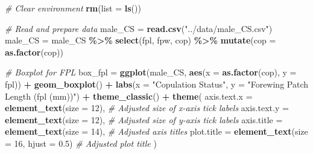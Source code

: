 \documentclass[
]{article}
\newenvironment{Shaded}{\begin{snugshade}}{\end{snugshade}}
\newcommand{\AttributeTok}[1]{\textcolor[rgb]{0.13,0.29,0.53}{#1}}
\newcommand{\CommentTok}[1]{\textcolor[rgb]{0.56,0.35,0.01}{\textit{#1}}}
\newcommand{\DecValTok}[1]{\textcolor[rgb]{0.00,0.00,0.81}{#1}}
\newcommand{\FloatTok}[1]{\textcolor[rgb]{0.00,0.00,0.81}{#1}}
\newcommand{\FunctionTok}[1]{\textcolor[rgb]{0.13,0.29,0.53}{\textbf{#1}}}
\newcommand{\NormalTok}[1]{#1}
\newcommand{\OtherTok}[1]{\textcolor[rgb]{0.56,0.35,0.01}{#1}}
\newcommand{\SpecialCharTok}[1]{\textcolor[rgb]{0.81,0.36,0.00}{\textbf{#1}}}
\newcommand{\StringTok}[1]{\textcolor[rgb]{0.31,0.60,0.02}{#1}}
\begin{document}
\begin{Shaded}
\begin{Highlighting}[]
\CommentTok{\# Clear environment}
\FunctionTok{rm}\NormalTok{(}\AttributeTok{list =} \FunctionTok{ls}\NormalTok{())}


\CommentTok{\# Read and prepare data}
\NormalTok{male\_CS }\OtherTok{=} \FunctionTok{read.csv}\NormalTok{(}\StringTok{"../data/male\_CS.csv"}\NormalTok{)}
\NormalTok{male\_CS }\OtherTok{=}\NormalTok{ male\_CS }\SpecialCharTok{\%\textgreater{}\%} 
  \FunctionTok{select}\NormalTok{(fpl, fpw, cop) }\SpecialCharTok{\%\textgreater{}\%} 
  \FunctionTok{mutate}\NormalTok{(}\AttributeTok{cop =} \FunctionTok{as.factor}\NormalTok{(cop))}

\CommentTok{\# Boxplot for FPL}
\NormalTok{box\_fpl }\OtherTok{=} \FunctionTok{ggplot}\NormalTok{(male\_CS, }\FunctionTok{aes}\NormalTok{(}\AttributeTok{x =} \FunctionTok{as.factor}\NormalTok{(cop), }\AttributeTok{y =}\NormalTok{ fpl)) }\SpecialCharTok{+}
  \FunctionTok{geom\_boxplot}\NormalTok{() }\SpecialCharTok{+}
  \FunctionTok{labs}\NormalTok{(}\AttributeTok{x =} \StringTok{"Copulation Status"}\NormalTok{, }\AttributeTok{y =} \StringTok{"Forewing Patch Length (fpl (mm))"}\NormalTok{) }\SpecialCharTok{+}
  \FunctionTok{theme\_classic}\NormalTok{() }\SpecialCharTok{+}
  \FunctionTok{theme}\NormalTok{(}
    \AttributeTok{axis.text.x =} \FunctionTok{element\_text}\NormalTok{(}\AttributeTok{size =} \DecValTok{12}\NormalTok{),  }\CommentTok{\# Adjusted size of x{-}axis tick labels}
    \AttributeTok{axis.text.y =} \FunctionTok{element\_text}\NormalTok{(}\AttributeTok{size =} \DecValTok{12}\NormalTok{),  }\CommentTok{\# Adjusted size of y{-}axis tick labels}
    \AttributeTok{axis.title =} \FunctionTok{element\_text}\NormalTok{(}\AttributeTok{size =} \DecValTok{14}\NormalTok{),   }\CommentTok{\# Adjusted axis titles}
    \AttributeTok{plot.title =} \FunctionTok{element\_text}\NormalTok{(}\AttributeTok{size =} \DecValTok{16}\NormalTok{, }\AttributeTok{hjust =} \FloatTok{0.5}\NormalTok{)  }\CommentTok{\# Adjusted plot title}
\NormalTok{  )}


\end{Highlighting}
\end{Shaded}
\end{document}
